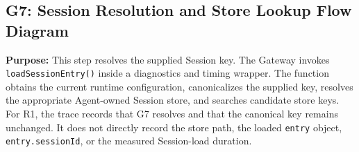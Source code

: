 
\subsection*{G7: Session Resolution and Store Lookup Flow Diagram}

\textbf{Purpose:}
This step resolves the supplied Session key. The Gateway invokes
\texttt{loadSessionEntry()} inside a diagnostics and timing wrapper. The
function obtains the current runtime configuration, canonicalizes the
supplied key, resolves the appropriate Agent-owned Session store, and
searches candidate store keys. For R1, the trace records that G7 resolves
and that the canonical key remains unchanged. It does not directly record
the store path, the loaded \texttt{entry} object, \texttt{entry.sessionId},
or the measured Session-load duration.

